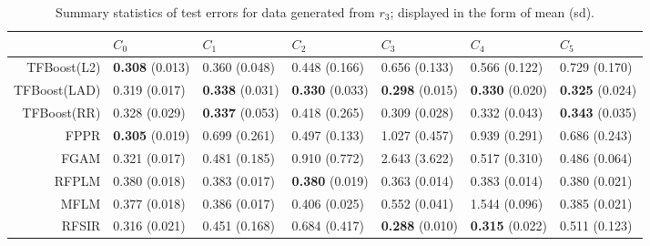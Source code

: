 \begin{table}[H]
\centering
\footnotesize
\begin{tabular}{rllllll}
  \hline
 & $C_0$ & $C_1$ & $C_2$ & $C_3$ & $C_4$ & $C_5$ \\ 
  \hline
TFBoost(L2) & \textbf{0.308} (0.013) & 0.360 (0.048) & 0.448 (0.166) & 0.656 (0.133) & 0.566 (0.122) & 0.729 (0.170) \\ 
  TFBoost(LAD) & 0.319 (0.017) & \textbf{0.338} (0.031) & \textbf{0.330} (0.033) & \textbf{0.298} (0.015) & \textbf{0.330} (0.020) & \textbf{0.325} (0.024) \\ 
  TFBoost(RR) & 0.328 (0.029) & \textbf{0.337} (0.053) & 0.418 (0.265) & 0.309 (0.028) & 0.332 (0.043) & \textbf{0.343} (0.035) \\ 
  FPPR & \textbf{0.305} (0.019) & 0.699 (0.261) & 0.497 (0.133) & 1.027 (0.457) & 0.939 (0.291) & 0.686 (0.243) \\ 
  FGAM & 0.321 (0.017) & 0.481 (0.185) & 0.910 (0.772) & 2.643 (3.622) & 0.517 (0.310) & 0.486 (0.064) \\ 
  RFPLM & 0.380 (0.018) & 0.383 (0.017) & \textbf{0.380} (0.019) & 0.363 (0.014) & 0.383 (0.014) & 0.380 (0.021) \\ 
  MFLM & 0.377 (0.018) & 0.386 (0.017) & 0.406 (0.025) & 0.552 (0.041) & 1.544 (0.096) & 0.385 (0.021) \\ 
  RFSIR & 0.316 (0.021) & 0.451 (0.168) & 0.684 (0.417) & \textbf{0.288} (0.010) & \textbf{0.315} (0.022) & 0.511 (0.123) \\ 
   \hline
\end{tabular}
\caption{Summary statistics of test errors for data generated from $r_3$; displayed in the form of mean (sd).} 
\end{table}
